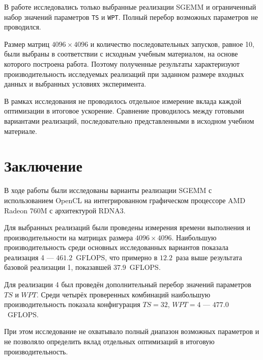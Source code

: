 \documentclass[a4paper]{article}
\begin{document}
В работе исследовались только выбранные реализации SGEMM и ограниченный набор значений параметров \texttt{TS} и \texttt{WPT}. Полный перебор возможных параметров не проводился.

Размер матриц $4096 \times 4096$ и количество последовательных запусков, равное 10, были выбраны в соответствии с исходным учебным материалом, на основе которого построена работа. Поэтому полученные результаты характеризуют производительность исследуемых реализаций при заданном размере входных данных и выбранных условиях эксперимента.

В рамках исследования не проводилось отдельное измерение вклада каждой оптимизации в итоговое ускорение. Сравнение проводилось между готовыми вариантами реализаций, последовательно представленными в исходном учебном материале.

\section{Заключение}

В ходе работы были исследованы варианты реализации SGEMM с использованием OpenCL на интегрированном графическом процессоре AMD Radeon 760M с архитектурой RDNA3.

Для выбранных реализаций были проведены измерения времени выполнения и производительности на матрицах размера $4096 \times 4096$. Наибольшую производительность среди основных исследованных вариантов показала реализация 4 --- $461.2$~GFLOPS, что примерно в $12.2$~раза выше результата базовой реализации 1, показавшей $37.9$~GFLOPS.

Для реализации 4 был проведён дополнительный перебор значений параметров $TS$ и $WPT$. Среди четырёх проверенных комбинаций наибольшую производительность показала конфигурация $TS=32$, $WPT=4$ --- $477.0$~GFLOPS.

При этом исследование не охватывало полный диапазон возможных параметров и не позволяло определить вклад отдельных оптимизаций в итоговую производительность.
\end{document}
